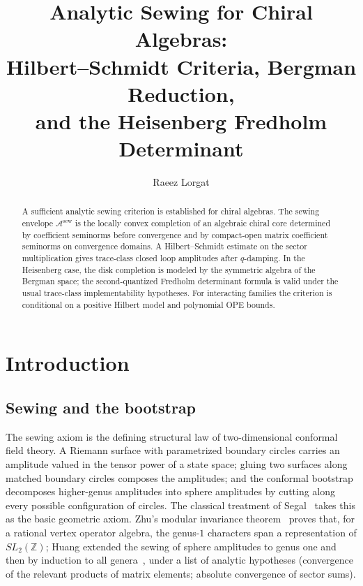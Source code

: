 \documentclass[11pt,reqno]{amsart}
\theoremstyle{definition}
\theoremstyle{remark}
\newcommand{\cA}{\mathcal{A}}
\numberwithin{equation}{section}
\begin{document}
\title[Analytic Sewing for Chiral Algebras]
{Analytic Sewing for Chiral Algebras:\\
Hilbert--Schmidt Criteria, Bergman Reduction,\\
and the Heisenberg Fredholm Determinant}

\author{Raeez Lorgat}
\address{Department of Mathematics, Harvard University,
 Cambridge, MA 02138, USA}

\date{}

\begin{abstract}
A sufficient analytic sewing criterion is established for chiral
algebras. The sewing envelope $\cA^{\mathrm{sew}}$ is the locally
convex completion of an algebraic chiral core determined by
coefficient seminorms before convergence and by compact-open matrix
coefficient seminorms on convergence domains. A Hilbert--Schmidt
estimate on the sector multiplication gives trace-class closed loop
amplitudes after $q$-damping. In the Heisenberg case, the disk
completion is modeled by
the symmetric algebra of the Bergman space; the second-quantized
Fredholm determinant formula is valid under the usual trace-class
implementability hypotheses. For interacting families the criterion is
conditional on a positive Hilbert model and polynomial OPE bounds.
\end{abstract}



\maketitle

\section{Introduction}\label{sec:intro}

\subsection{Sewing and the bootstrap}

The sewing axiom is the defining structural law of
two-dimensional conformal field theory. A Riemann surface with
parametrized boundary circles carries an amplitude valued in the
tensor power of a state space; gluing two surfaces along matched
boundary circles composes the amplitudes; and the conformal
bootstrap decomposes higher-genus amplitudes into sphere
amplitudes by cutting along every possible configuration of
circles. The classical treatment of Segal~\cite{Segal88} takes
this as the basic geometric axiom. Zhu's modular invariance
theorem~\cite{Zhu96} proves that, for a rational vertex operator
algebra, the genus-$1$ characters span a representation of
$SL_2(\mathbb{Z})$; Huang extended the sewing of
sphere amplitudes to genus one and then by induction to all
genera~\cite{Huang05}, under a list of analytic hypotheses
(convergence of the relevant products of matrix elements; absolute
convergence of sector sums).
\end{document}
